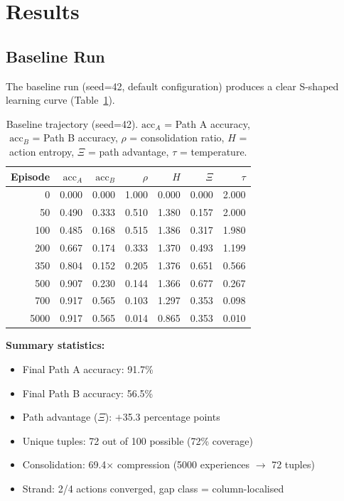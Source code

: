 \documentclass[11pt,a4paper]{article}
\begin{document}
\section{Results}

\subsection{Baseline Run}

The baseline run (seed=42, default configuration) produces a clear S-shaped learning curve (Table~\ref{tab:baseline}).

\begin{table}[H]
\centering
\small
\begin{tabular}{rrrrrrr}
\toprule
Episode & $\text{acc}_A$ & $\text{acc}_B$ & $\rho$ & $H$ & $\Xi$ & $\tau$ \\
\midrule
0    & 0.000 & 0.000 & 1.000 & 0.000 & 0.000 & 2.000 \\
50   & 0.490 & 0.333 & 0.510 & 1.380 & 0.157 & 2.000 \\
100  & 0.485 & 0.168 & 0.515 & 1.386 & 0.317 & 1.980 \\
200  & 0.667 & 0.174 & 0.333 & 1.370 & 0.493 & 1.199 \\
350  & 0.804 & 0.152 & 0.205 & 1.376 & 0.651 & 0.566 \\
500  & 0.907 & 0.230 & 0.144 & 1.366 & 0.677 & 0.267 \\
700  & 0.917 & 0.565 & 0.103 & 1.297 & 0.353 & 0.098 \\
5000 & 0.917 & 0.565 & 0.014 & 0.865 & 0.353 & 0.010 \\
\bottomrule
\end{tabular}
\caption{Baseline trajectory (seed=42). $\text{acc}_A$ = Path A accuracy, $\text{acc}_B$ = Path B accuracy, $\rho$ = consolidation ratio, $H$ = action entropy, $\Xi$ = path advantage, $\tau$ = temperature.}
\label{tab:baseline}
\end{table}

\noindent\textbf{Summary statistics:}

\begin{itemize}[nosep]
    \item Final Path A accuracy: 91.7\%
    \item Final Path B accuracy: 56.5\%
    \item Path advantage ($\Xi$): $+$35.3 percentage points
    \item Unique tuples: 72 out of 100 possible (72\% coverage)
    \item Consolidation: 69.4$\times$ compression (5000 experiences $\rightarrow$ 72 tuples)
    \item Strand: 2/4 actions converged, gap class = column-localised
\end{itemize}
\end{document}
